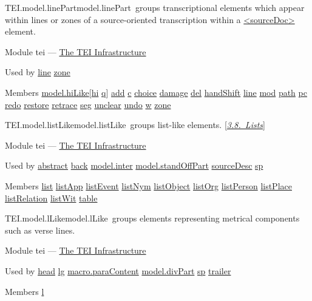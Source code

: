 \begin{reflist}
\item[]\begin{specHead}{TEI.model.linePart}{model.linePart} groups transcriptional elements which appear within lines or zones of a source-oriented transcription within a \hyperref[TEI.sourceDoc]{<sourceDoc>} element.\end{specHead} 
    \item[{Module}]
  tei — \hyperref[ST]{The TEI Infrastructure}
    \item[{Used by}]
  \hyperref[TEI.line]{line} \hyperref[TEI.zone]{zone}
    \item[{Members}]
  \hyperref[TEI.model.hiLike]{model.hiLike}[\hyperref[TEI.hi]{hi} \hyperref[TEI.q]{q}] \hyperref[TEI.add]{add} \hyperref[TEI.c]{c} \hyperref[TEI.choice]{choice} \hyperref[TEI.damage]{damage} \hyperref[TEI.del]{del} \hyperref[TEI.handShift]{handShift} \hyperref[TEI.line]{line} \hyperref[TEI.mod]{mod} \hyperref[TEI.path]{path} \hyperref[TEI.pc]{pc} \hyperref[TEI.redo]{redo} \hyperref[TEI.restore]{restore} \hyperref[TEI.retrace]{retrace} \hyperref[TEI.seg]{seg} \hyperref[TEI.unclear]{unclear} \hyperref[TEI.undo]{undo} \hyperref[TEI.w]{w} \hyperref[TEI.zone]{zone}
\end{reflist}  
\begin{reflist}
\item[]\begin{specHead}{TEI.model.listLike}{model.listLike} groups list-like elements. [\textit{\hyperref[COLI]{3.8.\ Lists}}]\end{specHead} 
    \item[{Module}]
  tei — \hyperref[ST]{The TEI Infrastructure}
    \item[{Used by}]
  \hyperref[TEI.abstract]{abstract} \hyperref[TEI.back]{back} \hyperref[TEI.model.inter]{model.inter} \hyperref[TEI.model.standOffPart]{model.standOffPart} \hyperref[TEI.sourceDesc]{sourceDesc} \hyperref[TEI.sp]{sp}
    \item[{Members}]
  \hyperref[TEI.list]{list} \hyperref[TEI.listApp]{listApp} \hyperref[TEI.listEvent]{listEvent} \hyperref[TEI.listNym]{listNym} \hyperref[TEI.listObject]{listObject} \hyperref[TEI.listOrg]{listOrg} \hyperref[TEI.listPerson]{listPerson} \hyperref[TEI.listPlace]{listPlace} \hyperref[TEI.listRelation]{listRelation} \hyperref[TEI.listWit]{listWit} \hyperref[TEI.table]{table}
\end{reflist}  
\begin{reflist}
\item[]\begin{specHead}{TEI.model.lLike}{model.lLike} groups elements representing metrical components such as verse lines.\end{specHead} 
    \item[{Module}]
  tei — \hyperref[ST]{The TEI Infrastructure}
    \item[{Used by}]
  \hyperref[TEI.head]{head} \hyperref[TEI.lg]{lg} \hyperref[TEI.macro.paraContent]{macro.paraContent} \hyperref[TEI.model.divPart]{model.divPart} \hyperref[TEI.sp]{sp} \hyperref[TEI.trailer]{trailer}
    \item[{Members}]
  \hyperref[TEI.l]{l}
\end{reflist}  
